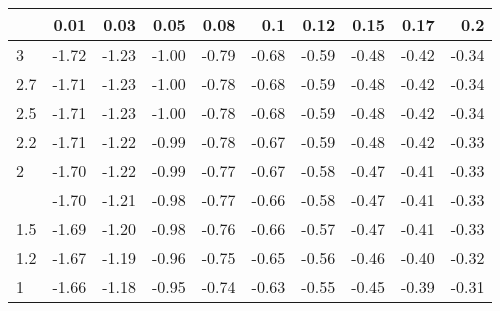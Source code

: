 
\begin{tabular}{lrrrrrrrrr}
\toprule
  & 0.01 & 0.03 & 0.05 & 0.08 & 0.1 & 0.12 & 0.15 & 0.17 & 0.2\\
\midrule
3 & -1.72 & -1.23 & -1.00 & -0.79 & -0.68 & -0.59 & -0.48 & -0.42 & -0.34\\
2.7 & -1.71 & -1.23 & -1.00 & -0.78 & -0.68 & -0.59 & -0.48 & -0.42 & -0.34\\
2.5 & -1.71 & -1.23 & -1.00 & -0.78 & -0.68 & -0.59 & -0.48 & -0.42 & -0.34\\
2.2 & -1.71 & -1.22 & -0.99 & -0.78 & -0.67 & -0.59 & -0.48 & -0.42 & -0.33\\
2 & -1.70 & -1.22 & -0.99 & -0.77 & -0.67 & -0.58 & -0.47 & -0.41 & -0.33\\
\addlinespace
1.7 & -1.70 & -1.21 & -0.98 & -0.77 & -0.66 & -0.58 & -0.47 & -0.41 & -0.33\\
1.5 & -1.69 & -1.20 & -0.98 & -0.76 & -0.66 & -0.57 & -0.47 & -0.41 & -0.33\\
1.2 & -1.67 & -1.19 & -0.96 & -0.75 & -0.65 & -0.56 & -0.46 & -0.40 & -0.32\\
1 & -1.66 & -1.18 & -0.95 & -0.74 & -0.63 & -0.55 & -0.45 & -0.39 & -0.31\\
\bottomrule
\end{tabular}
